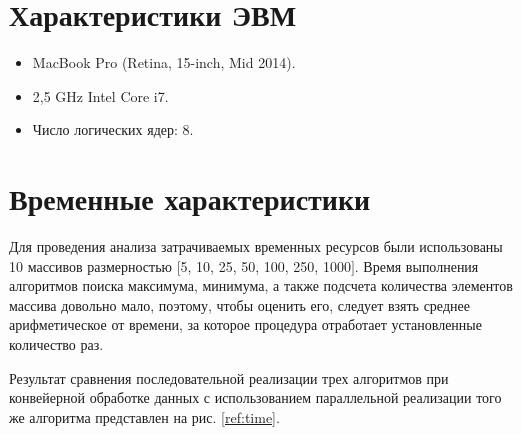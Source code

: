 \documentclass[12pt]{report}
\begin{document}
\section{Характеристики ЭВМ}

\begin{itemize}
	\item MacBook Pro (Retina, 15-inch, Mid 2014).
	\item 2,5 GHz Intel Core i7.
	\item Число логических ядер: 8.
\end{itemize}

\section{Временные характеристики} 

Для проведения анализа затрачиваемых временных ресурсов были использованы 10 массивов размерностью
$[$5, 10, 25, 50, 100, 250, 1000$]$.
Время выполнения алгоритмов поиска максимума, минимума, а также подсчета количества элементов массива довольно мало, поэтому, чтобы оценить его, следует взять среднее арифметическое от времени, за которое процедура отработает установленные количество раз.

Результат сравнения последовательной реализации трех алгоритмов
при конвейерной обработке данных с использованием параллельной реализации того же алгоритма представлен на рис. \ref{ref:time}.

\begin{figure}[ht!]
\end{figure}
\end{document}
